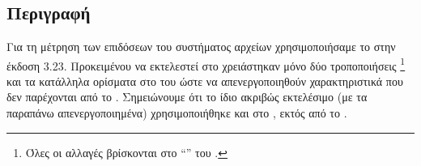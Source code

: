 \section{}
\subsection{Περιγραφή}
Για τη μέτρηση των επιδόσεων του συστήματος αρχείων χρησιμοποιήσαμε το
 \cite{fio} στην έκδοση 3.23. Προκειμένου να
εκτελεστεί στο \osv{} χρειάστηκαν μόνο δύο τροποποιήσεις%
\footnote{Όλες οι αλλαγές βρίσκονται στο ``''  του
.}
και τα κατάλληλα ορίσματα στο  του  ώστε να
απενεργοποιηθούν χαρακτηριστικά που δεν παρέχονται από το \osv{}. Σημειώνουμε
ότι το ίδιο ακριβώς εκτελέσιμο (με τα παραπάνω απενεργοποιημένα) χρησιμοποιήθηκε
και στο \linux{}, εκτός από το \osv{}.

